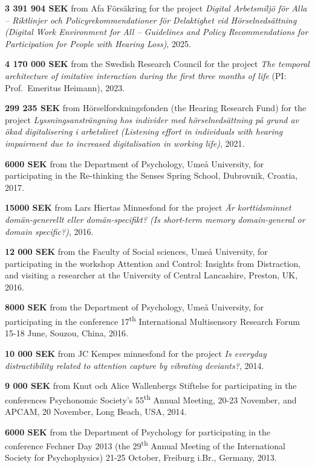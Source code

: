 \documentclass[]{article}
\begin{document}
\textbf{3 391 904 SEK} from Afa Försäkring for the project \emph{Digital
Arbetsmiljö för Alla -- Riktlinjer och Policyrekommendationer för
Delaktighet vid Hörselnedsättning (Digital Work Environment for All --
Guidelines and Policy Recommendations for Participation for People with
Hearing Loss)}, 2025.

\textbf{4 170 000 SEK} from the Swedish Research Council for the project
\emph{The temporal architecture of imitative interaction during the
first three months of life} (PI: Prof.~Emeritus Heimann), 2023.

\textbf{299 235 SEK} from Hörselforskningsfonden (the Hearing Research
Fund) for the project \emph{Lyssningsansträngning hos individer med
hörselnedsättning på grund av ökad digitalisering i arbetslivet
(Listening effort in individuals with hearing impairment due to
increased digitalisation in working life)}, 2021.

\textbf{6000 SEK} from the Department of Psychology, Umeå University,
for participating in the Re-thinking the Senses Spring School,
Dubrovnik, Croatia, 2017.

\textbf{15000 SEK} from Lars Hiertas Minnesfond for the project \emph{Är
korttidsminnet domän-generellt eller domän-specifikt? (Is short-term
memory domain-general or domain specific?)}, 2016.

\textbf{12 000 SEK} from the Faculty of Social sciences, Umeå
University, for participating in the workshop Attention and Control:
Insights from Distraction, and visiting a researcher at the University
of Central Lancashire, Preston, UK, 2016.

\textbf{8000 SEK} from the Department of Psychology, Umeå University,
for participating in the conference 17\textsuperscript{th} International
Multisensory Research Forum 15-18 June, Souzou, China, 2016.

\textbf{10 000 SEK} from JC Kempes minnesfond for the project \emph{Is
everyday distractibility related to attention capture by vibrating
deviants?}, 2014.

\textbf{9 000 SEK} from Knut och Alice Wallenbergs Stiftelse for
participating in the conferences Psychonomic Society's
55\textsuperscript{th} Annual Meeting, 20-23 November, and APCAM, 20
November, Long Beach, USA, 2014.

\textbf{6000 SEK} from the Department of Psychology for participating in
the conference Fechner Day 2013 (the 29\textsuperscript{th} Annual
Meeting of the International Society for Psychophysics) 21-25 October,
Freiburg i.Br., Germany, 2013.
\end{document}
